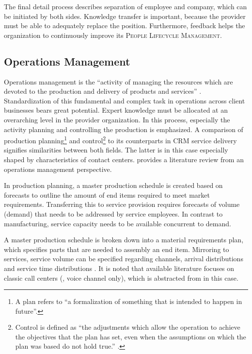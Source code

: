 	The final detail process describes separation of employee and company, which can be initiated by both sides. Knowledge transfer is important, because the provider must be able to adequately replace the position. Furthermore, feedback helps the organization to continuously improve its  \textsc{People Lifecycle Management}.
	
	
	
	\subsection{Operations Management}
	\label{sec:wofom}

		
	Operations management is the \enquote{activity of managing the resources which are devoted to the production and delivery of products and services} \citep[]{0273708473}. Standardization of this fundamental and complex task in operations across client businesses bears great potential. Expert knowledge must be allocated at an overarching level in the provider organization. In this process, especially the activity planning and controlling the production is emphasized. A comparison of production planning\footnote{A plan refers to \enquote{a formalization of something that is intended to happen in future}\citep[]{9780273756194}.} and control\footnote{Control is defined as \enquote{the adjustments which allow the operation to achieve the objectives that the plan has set, even when the assumptions on which the plan was based do not hold true.} \citep[]{9780273756194}. } \citep{9780130176158} to its counterparts in \acrshort{CRM} service delivery signifies similarities between both fields. 
	The latter is in this case especially shaped by characteristics of contact centers. \cite{Aksin_2009} provides a  literature review from an operations management perspective. 

	In production planning, a master production schedule is created based on forecasts to outline the amount of end items required to meet market requirements. Transferring this to service provision requires forecasts of volume (demand) that needs to be addressed by service employees. In contrast to manufacturing, service capacity needs to be available concurrent to demand. 

	A master production schedule is broken down into a material requirements plan, which specifies parts that are needed to assembly an end item. Mirroring to services, service volume can be specified regarding channels, arrival distributions and service time distributions \citep{Aksin_2009}. It is noted that available literature focuses on classic call centers (\ie, voice channel only), which is abstracted from in this case. 
	

